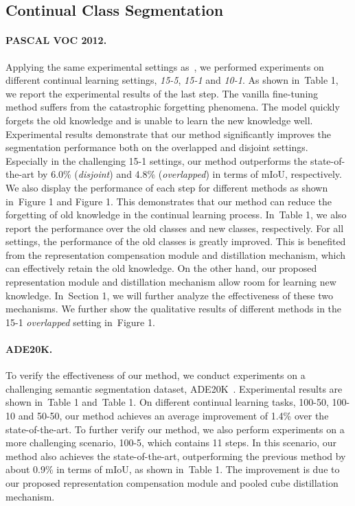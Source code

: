 \documentclass[10pt,twocolumn,letterpaper]{article}
\newcommand{\myPara}[1]{\vspace{-.08in}\paragraph{#1}}
\newcommand{\figref}[1]{Figure 1}\newcommand{\tabref}[1]{Table 1}\newcommand{\secref}[1]{Section 1}
\newcommand{\figref}[1]{Fig.~\ref{#1}}\newcommand{\tabref}[1]{Tab.~\ref{#1}}\newcommand{\secref}[1]{Sec.~\ref{#1}}
\begin{document}
\subsection{Continual Class Segmentation}


\myPara{PASCAL VOC 2012.}
Applying the same experimental settings as~\cite{mib,plop,sdr},
we performed experiments on different continual learning settings, \emph{15-5},
\emph{15-1} and \emph{10-1}.
As shown in~\tabref{tab:pascal},
we report the experimental results of the last step.
The vanilla fine-tuning method suffers from the catastrophic forgetting phenomena.
The model quickly forgets the old knowledge and is unable to learn the new knowledge well.
Experimental results demonstrate that
our method significantly improves the segmentation performance
both on the overlapped and disjoint settings.
Especially in the challenging 15-1 settings,
our method outperforms the state-of-the-art by
6.0\% (\emph{disjoint}) and 4.8\% (\emph{overlapped}) in terms of mIoU, respectively.
We also display the performance of each step for different methods
as shown in~\figref{fig:all-disjoint} and \figref{fig:all-overlapped}.
This demonstrates that our method can reduce the forgetting of old knowledge in the continual learning process.
In~\tabref{tab:pascal},
we also report the performance over the old classes and new classes, respectively.
For all settings,
the performance of the old classes is greatly improved.
This is benefited from the representation compensation module and distillation mechanism,
which can effectively retain the old knowledge.
On the other hand,
our proposed representation module and distillation mechanism
allow room for learning new knowledge.
In~\secref{sec:ablation},
we will further analyze the effectiveness of these two mechanisms.
We further show the qualitative results of different methods
in the 15-1 \emph{overlapped} setting in~\figref{fig:qualitative}.






\paragraph{ADE20K.}
To verify the effectiveness of our method,
we conduct experiments on a challenging semantic segmentation dataset,
ADE20K~\cite{zhou2017scene}.
Experimental results are shown in~\tabref{tab:ade} and~\tabref{tab:ade20k-100-5}.
On different continual learning tasks, 100-50, 100-10 and 50-50,
our method achieves an average improvement of 1.4\% over the state-of-the-art.
To further verify our method,
we also perform experiments on a more challenging scenario, 100-5,
which contains 11 steps.
In this scenario,
our method also achieves the state-of-the-art, outperforming the previous method
by about 0.9\% in terms of mIoU,
as shown in~\tabref{tab:ade20k-100-5}.
The improvement is due to our proposed representation compensation module
and pooled cube distillation mechanism.
\end{document}
